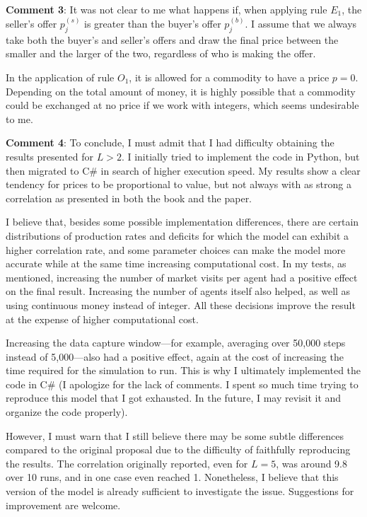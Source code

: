 \textbf{Comment 3}: It was not clear to me what happens if, when applying rule $E_1$, the seller's offer $p_j^{(s)}$ is greater than the buyer's offer $p_j^{(b)}$. I assume that we always take both the buyer's and seller's offers and draw the final price between the smaller and the larger of the two, regardless of who is making the offer.  

In the application of rule $O_1$, it is allowed for a commodity to have a price $p=0$. Depending on the total amount of money, it is highly possible that a commodity could be exchanged at no price if we work with integers, which seems undesirable to me.


\textbf{Comment 4}: To conclude, I must admit that I had difficulty obtaining the results presented for $L>2$. I initially tried to implement the code in Python, but then migrated to C\# in search of higher execution speed. My results show a clear tendency for prices to be proportional to value, but not always with as strong a correlation as presented in both the book and the paper.

I believe that, besides some possible implementation differences, there are certain distributions of production rates and deficits for which the model can exhibit a higher correlation rate, and some parameter choices can make the model more accurate while at the same time increasing computational cost. In my tests, as mentioned, increasing the number of market visits per agent had a positive effect on the final result. Increasing the number of agents itself also helped, as well as using continuous money instead of integer. All these decisions improve the result at the expense of higher computational cost.

Increasing the data capture window—for example, averaging over 50,000 steps instead of 5,000—also had a positive effect, again at the cost of increasing the time required for the simulation to run. This is why I ultimately implemented the code in C\# (I apologize for the lack of comments. I spent so much time trying to reproduce this model that I got exhausted. In the future, I may revisit it and organize the code properly).


However, I must warn that I still believe there may be some subtle differences compared to the original proposal due to the difficulty of faithfully reproducing the results. The correlation originally reported, even for $L=5$, was around 9.8 over 10 runs, and in one case even reached 1. Nonetheless, I believe that this version of the model is already sufficient to investigate the issue. Suggestions for improvement are welcome.  

